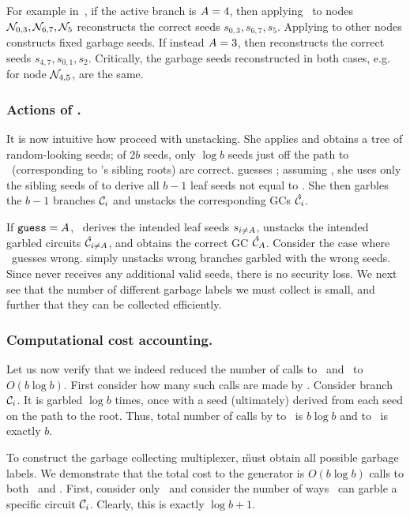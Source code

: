 For example in~, if the active branch is $A=4$,
then applying \gadget\ to nodes $\mathtt{\cal N}_{0,3}, \mathtt{\cal N}_{6,7},
\mathtt{\cal N}_{5}$ reconstructs the correct seeds $s_{0,3}, s_{6,7}, s_{5}$.  Applying \gadget to other nodes
constructs fixed garbage seeds.
If instead $A=3$, then \gadget
reconstructs the correct seeds $s_{4,7}, s_{0,1}, s_{2}$.
Critically, the
garbage seeds reconstructed
in both cases, e.g. for node $\mathtt{\cal N}_{4,5}$, are the same.


\subsubsection{Actions of \E.}

It is now intuitive how \E proceed with unstacking. 
She applies \gadget and obtains a tree of random-looking seeds; of $2b$
seeds, only $\log b$ seeds just off the path to \aid\ (corresponding
to \aid's sibling roots) are correct.  \E guesses \guess; assuming
\guess, she uses only the sibling seeds of \guess to derive all
$b-1$ leaf seeds not equal to \guess.  She then garbles the $b-1$
branches $\mathcal C_i$ and unstacks the corresponding GCs $\hat{\mathcal C}_i$.

If $\mathtt{guess}=A$, \E\ derives the intended leaf seeds
$s_{i\neq A}$, unstacks the intended garbled circuits
$\hat{\mathcal C}_{i\neq A}$, and obtains the correct GC $\hat{\mathcal C}_{A}$.
%
Consider the case where \E\ guesses wrong. %
\E simply unstacks wrong branches garbled with the wrong seeds.
Since \E never receives any additional valid seeds,
there is no security loss.  We next see that the number of different
garbage labels we must collect is small, and further that they can be
collected efficiently.

\subsubsection{Computational cost accounting.} Let us now verify that
we indeed reduced the number of calls to \Gb\ and \Ev\ to $O(b \log
b)$.  First consider how many such calls are
made by \E.  Consider branch $\mathcal C_i$.  It is garbled $\log b$ times,
once with a seed (ultimately) derived from each seed on the path to
the root.  Thus, total number of calls by \E to \Gb\ is $b \log b$ and
to \Ev\ is exactly $b$.  

To construct the garbage collecting multiplexer, \G must obtain all possible garbage labels.  We
demonstrate that the total cost to the generator is $O(b \log b)$
calls to both \Gb\ and \Ev.
First, consider only \Gb\ and consider the number of ways \E\ can garble a specific circuit $\mathcal C_i$. Clearly, this is exactly $\log b+1$.

